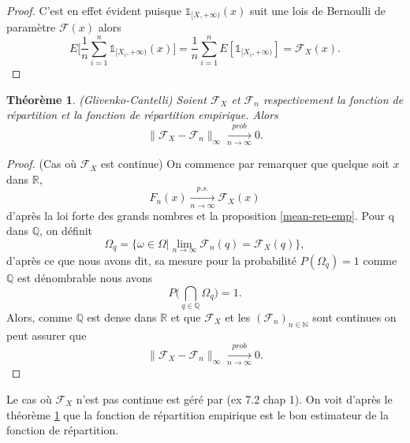 \documentclass[a4paper,11pt]{article}
\numberwithin{equation}{section}
\newtheorem{theorem}{Théorème}[section]
\begin{document}
\begin{proof}
	C'est en effet évident puisque $\mathds{1}_{[X, +\infty )}(x)$ suit une lois de Bernoulli de paramètre $\mathcal{F}(x)$ alors 
	\[E\Big[\frac{1}{n}\sum_{i=1}^{n}\mathds{1}_{[X_i, +\infty )}(x)\Big]= \frac{1}{n}\sum_{i=1}^{n}E[\mathds{1}_{[X_i, +\infty )}]=\mathcal{F}_{X}(x).\]
\end{proof}


\begin{theorem}(Glivenko-Cantelli)
	\label{th:glivenko}
	Soient $\mathcal{F}_{X}$ et $\mathcal{F}_{n}$ respectivement la fonction de répartition et la fonction de répartition empirique. Alors 
	\begin{equation}
		\|\mathcal{F}_{X}-\mathcal{F}_{n}\|_{\infty} \xrightarrow[n\to \infty]{prob} 0.
	\end{equation}
\end{theorem}

\begin{proof} (Cas où $\mathcal{F}_X$ est continue)
	On commence par remarquer que quelque soit $x$ dans $\mathbb{R}$, \[F_{n}(x)\xrightarrow[n\to \infty]{p.s.}\mathcal{F}_X(x)\] d'après la loi forte des grands nombres et la proposition \eqref{mean-rep-emp}. Pour q dans $\mathbb{Q}$, on définit 
	\[\Omega_{q}=\{\omega \in \Omega | \lim_{n \to \infty} \mathcal{F}_{n}(q)=\mathcal{F}_X(q)\},\]
	d'après ce que nous avons dit, sa mesure pour la probabilité $P(\Omega_q)=1$ comme $\mathbb{Q}$ est dénombrable nous avons  
	\[P\Big(\bigcap_{q \in \mathbb{Q}} \Omega_q \Big)=1.\]
	Alors, comme $\mathbb{Q}$ est dense dans $\mathbb{R}$ et que $\mathcal{F}_{X}$ et les $(\mathcal{F}_n)_{n \in \mathbb{N}}$ sont continues on peut assurer que   
	\[	\|\mathcal{F}_{X}-\mathcal{F}_{n}\|_{\infty} \xrightarrow[n\to \infty]{prob} 0. \]
\end{proof}
Le cas où $\mathcal{F}_{X}$ n'est pas continue est géré par \cite{durrett2019probability} (ex 7.2 chap 1). On voit d'après le théorème \ref{th:glivenko} que la fonction de répartition empirique est le bon estimateur de la fonction de répartition. 
\end{document}
